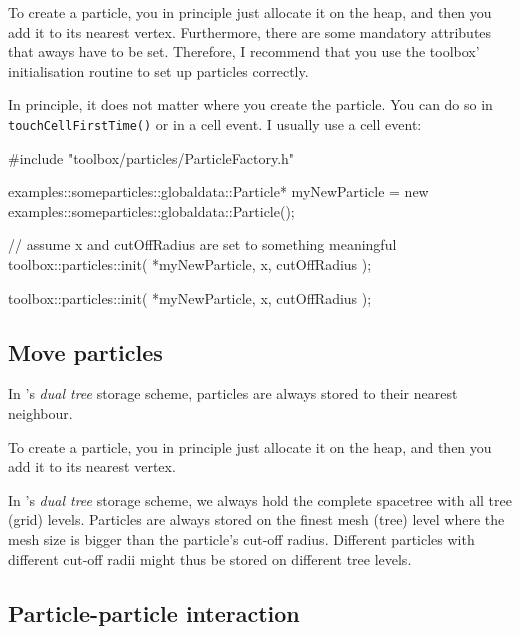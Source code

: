 To create a particle, you in principle just allocate it on the heap, and then
you add it to its nearest vertex.
Furthermore, there are some mandatory attributes that aways have to be set. 
Therefore, I recommend that you use the toolbox' initialisation routine to set
up particles correctly.


In principle, it does not matter where you create the particle.
You can do so in \texttt{touchCellFirstTime()} or in a cell event. 
I usually use a cell event:


\begin{code}
#include "toolbox/particles/ParticleFactory.h"

examples::someparticles::globaldata::Particle* myNewParticle = 
  new examples::someparticles::globaldata::Particle();
  
// assume x and cutOffRadius are set to something meaningful
toolbox::particles::init( *myNewParticle, x, cutOffRadius );

toolbox::particles::init( *myNewParticle, x, cutOffRadius );

\end{code}


\subsection{Move particles}

\begin{definition}
 In \Swift's \emph{dual tree} storage scheme, particles are always stored to
 their nearest neighbour.
\end{definition}


To create a particle, you in principle just allocate it on the heap, and then
you add it to its nearest vertex.


\begin{definition}
 In \Swift's \emph{dual tree} storage scheme, we always hold the
 complete spacetree with all tree (grid) levels. Particles are always stored on
 the finest mesh (tree) level where the mesh size is bigger than the particle's
 cut-off radius. 
 Different particles with different cut-off radii might thus be stored on
 different tree levels.
\end{definition}


\subsection{Particle-particle interaction}




